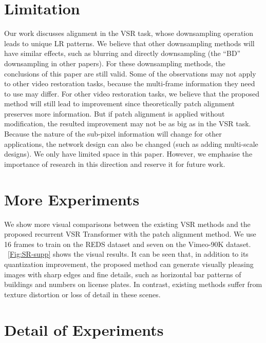 \documentclass{article}
\begin{document}
\section{Limitation}
\vspace{-2mm}
Our work discusses alignment in the VSR task, whose downsampling operation leads to unique LR patterns.
We believe that other downsampling methods will have similar effects, such as blurring and directly downsampling (the ``BD'' downsampling in other papers).
For these downsampling methods, the conclusions of this paper are still valid.
Some of the observations may not apply to other video restoration tasks, because the multi-frame information they need to use may differ.
For other video restoration tasks, we believe that the proposed method will still lead to improvement since theoretically patch alignment preserves more information.
But if patch alignment is applied without modification, the resulted improvement may not be as big as in the VSR task.
Because the nature of the sub-pixel information will change for other applications, the network design can also be changed (such as adding multi-scale designs).
We only have limited space in this paper.
However, we emphasise the importance of research in this direction and reserve it for future work.


\vspace{-3mm}
\section{More Experiments}
\vspace{-2mm}
We show more visual comparisons between the existing VSR methods and the proposed recurrent VSR Transformer with the patch alignment method.
We use 16 frames to train on the REDS dataset and seven on the Vimeo-90K dataset.
\figurename~\ref{Fig:SR-supp} shows the visual results.
It can be seen that, in addition to its quantization improvement, the proposed method can generate visually pleasing images with sharp edges and fine details, such as horizontal bar patterns of buildings and numbers on license plates.
In contrast, existing methods suffer from texture distortion or loss of detail in these scenes.

\vspace{-3mm}
\section{Detail of Experiments}
\label{sec:apd:detail}
\vspace{-2mm}
\end{document}
